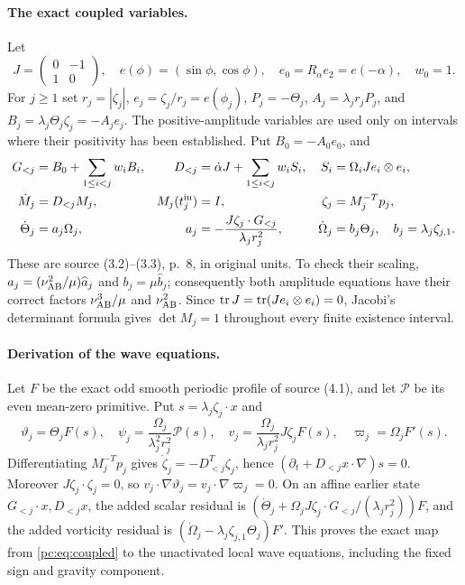 \paragraph{The exact coupled variables.}
Let
\[
 J=\begin{pmatrix}0&-1\\1&0\end{pmatrix},\quad
 e(\phi)=(\sin\phi,\cos\phi),\quad e_0=R_\alpha e_2=e(-\alpha),\quad w_0=1.
\]
For $j\ge1$ set $r_j=|\zeta_j|$, $e_j=\zeta_j/r_j=e(\phi_j)$, $P_j=-\Theta_j$, $A_j=\lambda_jr_jP_j$, and $B_j=\lambda_j\Theta_j\zeta_j=-A_je_j$. The positive-amplitude variables are used only on intervals where their positivity has been established. Put $B_0=-A_0e_0$, and
\begin{equation}\label{pc:eq:coupled}
 \begin{aligned}
 G_{<j}&=B_0+\sum_{1\le i<j}w_iB_i,
 &D_{<j}&=\dot\alpha J+\sum_{1\le i<j}w_iS_i,
 &S_i&=\Omega_iJe_i\otimes e_i,\\
 \dot M_j&=D_{<j}M_j,
 &M_j(t_j^{\rm in})&=I,
 &\zeta_j&=M_j^{-T}p_j,\\
 \dot\Theta_j&=a_j\Omega_j,
 &a_j&=-\frac{J\zeta_j\cdot G_{<j}}{\lambda_jr_j^2},
 &\dot\Omega_j&=b_j\Theta_j,\quad b_j=\lambda_j\zeta_{j,1}.
 \end{aligned}
\end{equation}
These are source (3.2)--(3.3), p.~8, in original units. To check their scaling, $a_j=(\nu_{\mathrm{AB}}^2/\mu)\widehat a_j$ and $b_j=\mu\widehat b_j$; consequently both amplitude equations have their correct factors $\nu_{\mathrm{AB}}^3/\mu$ and $\nu_{\mathrm{AB}}^2$. Since $\operatorname{tr} J=\operatorname{tr}(Je_i\otimes e_i)=0$, Jacobi's determinant formula gives $\det M_j=1$ throughout every finite existence interval.

\paragraph{Derivation of the wave equations.}
Let $F$ be the exact odd smooth periodic profile of source (4.1), and let $\mathcal P$ be its even mean-zero primitive. Put $s=\lambda_j\zeta_j\cdot x$ and
\[
 \vartheta_j=\Theta_jF(s),\quad
 \psi_j=\frac{\Omega_j}{\lambda_j^2r_j^2}\mathcal P(s),\quad
 v_j=\frac{\Omega_j}{\lambda_jr_j^2}J\zeta_j F(s),\quad
 \varpi_j=\Omega_jF'(s).
\]
Differentiating $M_j^{-T}p_j$ gives $\dot\zeta_j=-D_{<j}^T\zeta_j$, hence $(\partial_t+D_{<j}x\cdot\nabla)s=0$. Moreover $J\zeta_j\cdot\zeta_j=0$, so $v_j\cdot\nabla\vartheta_j=v_j\cdot\nabla\varpi_j=0$. On an affine earlier state $G_{<j}\cdot x,D_{<j}x$, the added scalar residual is $(\dot\Theta_j+\Omega_jJ\zeta_j\cdot G_{<j}/(\lambda_jr_j^2))F$, and the added vorticity residual is $(\dot\Omega_j-\lambda_j\zeta_{j,1}\Theta_j)F'$. This proves the exact map from \eqref{pc:eq:coupled} to the unactivated local wave equations, including the fixed sign and gravity component.

